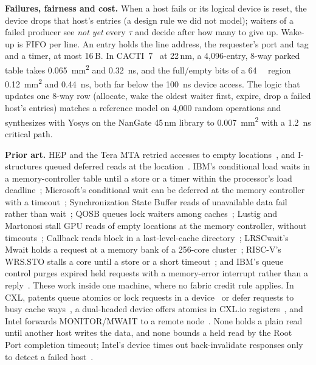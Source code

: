 \documentclass[journal]{IEEEtran}
\begin{document}
\textbf{Failures, fairness and cost.} When a host fails or its logical device is reset, the device
drops that host's entries (a design rule we did not model); waiters of a failed producer see
\emph{not yet} every $\tau$ and decide after how many to give up. Wake-up is FIFO per line. An entry holds the
line address, the requester's port and tag and a timer, at most 16\,B. In CACTI~7~\cite{cacti7} at 22\,nm, a
4,096-entry, 8-way parked table takes \SI{0.065}{\milli\meter\squared} and \SI{0.32}{\nano\second}, and the
full/empty bits of a \SI{64}{\mebi\byte} region \SI{0.12}{\milli\meter\squared} and \SI{0.44}{\nano\second}, both far
below the \SI{100}{\nano\second} device access. The logic that updates one 8-way row (allocate, wake
the oldest waiter first, expire, drop a failed host's entries) matches a reference model on 4,000 random operations and synthesizes with Yosys on the NanGate 45\,nm library to
\SI{0.007}{\milli\meter\squared} with a \SI{1.2}{\nano\second} critical path.

\textbf{Prior art.}\label{sec:prior} HEP and the Tera MTA retried accesses to empty
locations~\cite{tera}, and I-structures queued deferred reads at the location~\cite{istructures}.
IBM's conditional load waits in a memory-controller table until a store or a timer within the
processor's load deadline~\cite{ibmclt}; Microsoft's conditional wait can be deferred at the memory
controller with a timeout~\cite{msftcond}; Synchronization State Buffer reads of unavailable data
fail rather than wait~\cite{ssb}; QOSB queues lock waiters among caches~\cite{qolb}; Lustig and
Martonosi stall GPU reads of empty locations at the memory controller, without timeouts~\cite{lustig};
Callback reads block in a last-level-cache directory~\cite{callback}; LRSCwait's Mwait holds a
request at a memory bank of a 256-core cluster~\cite{lrscwait}; RISC-V's WRS.STO stalls a core until
a store or a short timeout~\cite{zawrs}; and IBM's queue control purges expired held requests with a
memory-error interrupt rather than a reply~\cite{ibmqueue}. These work inside one machine, where no
fabric credit rule applies. In CXL, patents queue atomics or lock requests in a device~\cite{intelq,intellock} or defer
requests to busy cache ways~\cite{micron}, a dual-headed device offers atomics in CXL.io
registers~\cite{amdshare}, and Intel forwards MONITOR/MWAIT to a remote node~\cite{intelmwait}. None holds a plain read until another host writes the data, and none bounds
a held read by the Root Port completion timeout; Intel's device times out back-invalidate responses
only to detect a failed host~\cite{intelq}.
\end{document}
